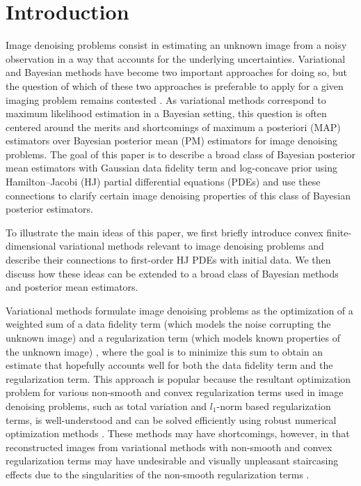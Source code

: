 


\section{Introduction} \label{sec:intro}
Image denoising problems consist in estimating an unknown image from a noisy observation in a way that accounts for the underlying uncertainties. Variational and Bayesian methods have become two important approaches for doing so, but the question of which of these two approaches is preferable to apply for a given imaging problem remains contested \cite{louchet2008modeles,louchet2013posterior,burger2014maximum,gribonval2018bayesian}. As variational methods correspond to maximum likelihood estimation in a Bayesian setting, this question is often centered around the merits and shortcomings of maximum a posteriori (MAP) estimators over Bayesian posterior mean (PM) estimators for image denoising problems. The goal of this paper is to describe a broad class of Bayesian posterior mean estimators with Gaussian data fidelity term and log-concave prior using Hamilton--Jacobi (HJ) partial differential equations (PDEs) and use these connections to clarify certain image denoising properties of this class of Bayesian posterior estimators.

To illustrate the main ideas of this paper, we first briefly introduce convex finite-dimensional variational methods relevant to image denoising problems and describe their connections to first-order HJ PDEs with initial data. We then discuss how these ideas can be extended to a broad class of Bayesian methods and posterior mean estimators.

Variational methods formulate image denoising problems as the optimization of a weighted sum of a data fidelity term (which models the noise corrupting the unknown image) and a regularization term (which models known properties of the unknown image) \cite{chambolle2016introduction,darbon2015convex}, where the goal is to minimize this sum to obtain an estimate that hopefully accounts well for both the data fidelity term and the regularization term. This approach is popular because the resultant optimization problem for various non-smooth and convex regularization terms used in image denoising problems, such as total variation and $l_1$-norm based regularization terms, is well-understood \cite{bouman1993generalized,candes2006robust,chambolle1997image,darbon2015convex,darbon2019decomposition,donoho2006compressed,rudin1992nonlinear} and can be solved efficiently using robust numerical optimization methods \cite{chambolle2016introduction}. These methods may have shortcomings, however, in that reconstructed images from variational methods with non-smooth and convex regularization terms may have undesirable and visually unpleasant staircasing effects due to the singularities of the non-smooth regularization terms \cite{nikolova2007model,louchet2008modeles,woodford2009global}.

